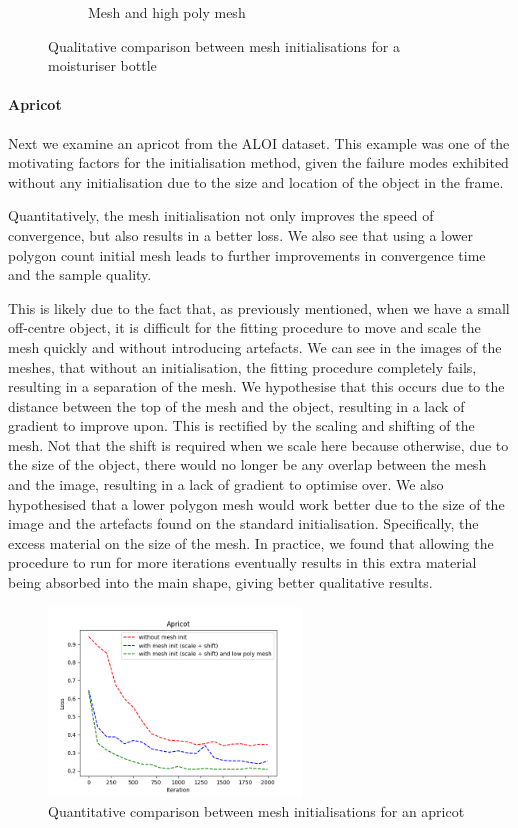 \documentclass{article}
\begin{document}
\begin{figure}[h!]
\begin{subfigure}{.2\textwidth}
    \caption{Mesh and high poly mesh}
    \label{results-moisturiser-png}
  \end{subfigure}
  \caption{Qualitative comparison between mesh initialisations for a moisturiser bottle}
  \label{results-moisturiser}
\end{figure}

\newpage
\paragraph{Apricot}

Next we examine an apricot from the ALOI dataset. This example was one of the motivating factors for the initialisation method, given the failure modes exhibited without any initialisation due to the size and location of the object in the frame.

Quantitatively, the mesh initialisation not only improves the speed of convergence, but also results in a better loss. We also see that using a lower polygon count initial mesh leads to further improvements in convergence time and the sample quality.

This is likely due to the fact that, as previously mentioned, when we have a small off-centre object, it is difficult for the fitting procedure to move and scale the mesh quickly and without introducing artefacts. We can see in the images of the meshes, that without an initialisation, the fitting procedure completely fails, resulting in a separation of the mesh. We hypothesise that this occurs due to the distance between the top of the mesh and the object, resulting in a lack of gradient to improve upon. This is rectified by the scaling and shifting of the mesh. Not that the shift is required when we scale here because otherwise, due to the size of the object, there would no longer be any overlap between the mesh and the image, resulting in a lack of gradient to optimise over. We also hypothesised that a lower polygon mesh would work better due to the size of the image and the artefacts found on the standard initialisation. Specifically, the excess material on the size of the mesh. In practice, we found that allowing the procedure to run for more iterations eventually results in this extra material being absorbed into the main shape, giving better qualitative results.

\begin{figure}[h!]
  \centering
  \includegraphics[width=0.6\textwidth]{images/apricotplot.png}
  \caption{Quantitative comparison between mesh initialisations for an apricot}
  \label{results-apricot-loss}
\end{figure}
\end{document}
